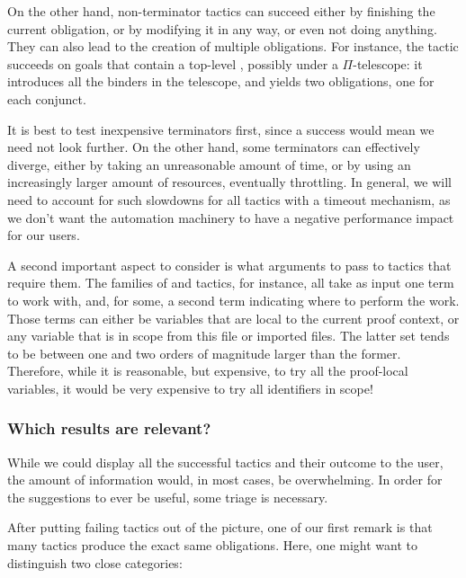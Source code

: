 On the other hand, non-terminator tactics can succeed either by finishing the
current obligation, or by modifying it in any way, or even not doing anything.
They can also lead to the creation of multiple obligations.  For instance, the
 tactic succeeds on goals that contain a top-level
, possibly under a $\Pi$-telescope: it introduces all the
binders in the telescope, and yields two obligations, one for each conjunct.

It is best to test inexpensive terminators first, since a success would mean we
need not look further.  On the other hand, some terminators can effectively
diverge, either by taking an unreasonable amount of time, or by using an
increasingly larger amount of resources, eventually throttling.  In general, we
will need to account for such slowdowns for all tactics with a timeout
mechanism, as we don't want the automation machinery to have a negative
performance impact for our users.

A second important aspect to consider is what arguments to pass to tactics that
require them.  The families of  and 
tactics, for instance, all take as input one term to work with, and, for some, a
second term indicating where to perform the work.  Those terms can either be
variables that are local to the current proof context, or any variable that is
in scope from this file or imported files.  The latter set tends to be between
one and two orders of magnitude larger than the former.  Therefore, while it is
reasonable, but expensive, to try all the proof-local variables, it would be
very expensive to try all identifiers in scope!

\subsubsection{Which results are relevant?}

While we could display all the successful tactics and their outcome to the user,
the amount of information would, in most cases, be overwhelming.  In order for the suggestions to ever be useful, some triage is necessary.

After putting failing tactics out of the picture, one of our first remark is
that many tactics produce the exact same obligations.  Here, one might want to distinguish two close categories:

